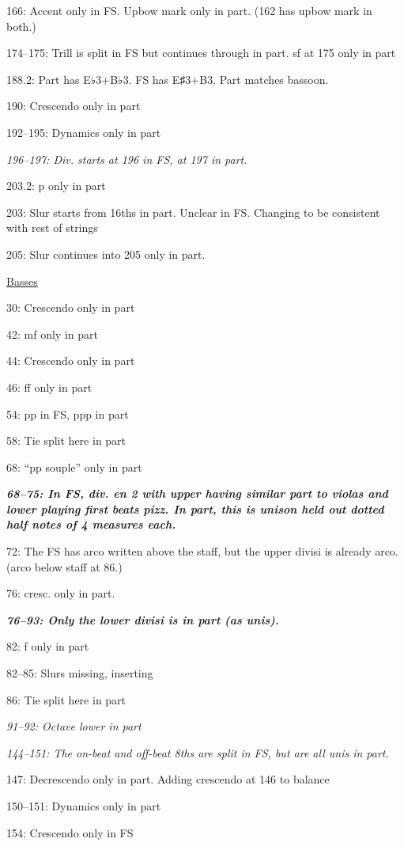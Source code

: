 \documentclass[twoside]{article}
\begin{document}
\begin{hangparas}{15pt}{1}
\begin{multicols}{2}
166: Accent only in FS. Upbow mark only in part. (162 has upbow mark in both.)

174--175: Trill is split in FS but continues through in part. sf at 175 only in part

188.2: Part has E♭3+B♭3. FS has E♯3+B3. Part matches bassoon.

190: Crescendo only in part

192--195: Dynamics only in part

\textit{196--197: Div. starts at 196 in FS, at 197 in part.}

203.2: p only in part

203: Slur starts from 16ths in part. Unclear in FS. Changing to be consistent with rest of strings

205: Slur continues into 205 only in part.

\underline{Basses}

30: Crescendo only in part

42: mf only in part

44: Crescendo only in part

46: ff only in part

54: pp in FS, ppp in part

58: Tie split here in part

68: ``pp souple'' only in part

\textbf{\textit{68--75: In FS, div. en 2 with upper having similar part to violas and lower playing first beats pizz. In part, this is unison held out dotted half notes of 4 measures each.}}

72: The FS has arco written above the staff, but the upper divisi is already arco. (arco below staff at 86.)

76: cresc. only in part. 

\textbf{\textit{76--93: Only the lower divisi is in part (as unis).}}

82: f only in part

82--85: Slurs missing, inserting

86: Tie split here in part

\textit{91--92: Octave lower in part}

\textit{144--151: The on-beat and off-beat 8ths are split in FS, but are all unis in part.}

147: Decrescendo only in part. Adding crescendo at 146 to balance

150--151: Dynamics only in part

154: Crescendo only in FS


\end{multicols}
\end{hangparas}
\end{document}
